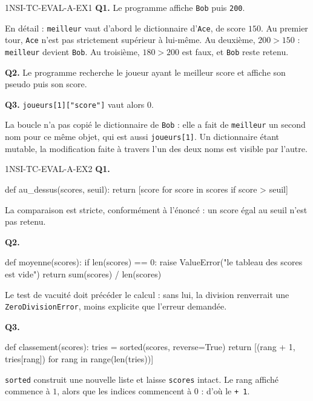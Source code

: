 \begin{corrige}{1NSI-TC-EVAL-A-EX1}
\textbf{Q1.} Le programme affiche \lstinline{Bob} puis \lstinline{200}.

En détail : \lstinline{meilleur} vaut d'abord le dictionnaire d'\lstinline{Ace}, de score $150$. Au premier tour, \lstinline{Ace} n'est pas strictement supérieur à lui-même. Au deuxième, $200 > 150$ : \lstinline{meilleur} devient \lstinline{Bob}. Au troisième, $180 > 200$ est faux, et \lstinline{Bob} reste retenu.

\textbf{Q2.} Le programme recherche le joueur ayant le meilleur score et affiche son pseudo puis son score.

\textbf{Q3.} \lstinline{joueurs[1]["score"]} vaut alors $0$.

La boucle n'a pas copié le dictionnaire de \lstinline{Bob} : elle a fait de \lstinline{meilleur} un second nom pour ce même objet, qui est aussi \lstinline{joueurs[1]}. Un dictionnaire étant mutable, la modification faite à travers l'un des deux noms est visible par l'autre.
\end{corrige}

\begin{corrige}{1NSI-TC-EVAL-A-EX2}
\textbf{Q1.}
\begin{python}
def au_dessus(scores, seuil):
    return [score for score in scores if score > seuil]
\end{python}
La comparaison est stricte, conformément à l'énoncé : un score égal au seuil n'est pas retenu.

\textbf{Q2.}
\begin{python}
def moyenne(scores):
    if len(scores) == 0:
        raise ValueError("le tableau des scores est vide")
    return sum(scores) / len(scores)
\end{python}
Le test de vacuité doit précéder le calcul : sans lui, la division renverrait une \lstinline{ZeroDivisionError}, moins explicite que l'erreur demandée.

\textbf{Q3.}
\begin{python}
def classement(scores):
    tries = sorted(scores, reverse=True)
    return [(rang + 1, tries[rang]) for rang in range(len(tries))]
\end{python}
\lstinline{sorted} construit une nouvelle liste et laisse \lstinline{scores} intact. Le rang affiché commence à $1$, alors que les indices commencent à $0$ : d'où le \lstinline{+ 1}.
\end{corrige}

